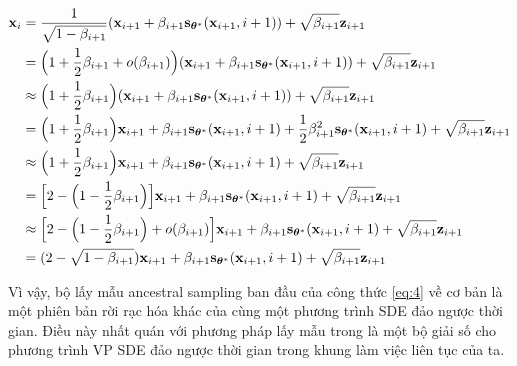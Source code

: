 \documentclass{article} %
\begin{document}
\begin{equation*}
    \begin{aligned}
        \bold{x}_i &= \dfrac{1}{\sqrt{1 - \beta_{i+1}}}(\bold{x}_{i+1} + \beta_{i+1} \bold{s}_{\boldsymbol{\theta}^{\ast}}(\bold{x}_{i+1}, i+1)) + \sqrt{\beta_{i+1}} \bold{z}_{i+1} \\
        &= \Big( 1 + \dfrac{1}{2} \beta_{i+1} + o(\beta_{i+1}) \Big)(\bold{x}_{i+1} + \beta_{i+1} \bold{s}_{\boldsymbol{\theta}^{\ast}}(\bold{x}_{i+1}, i+1)) + \sqrt{\beta_{i+1}} \bold{z}_{i+1} \\
        &\approx \Big( 1 + \dfrac{1}{2}\beta_{i+1} \Big)(\bold{x}_{i+1} + \beta_{i+1} \bold{s}_{\boldsymbol{\theta}^{\ast}}(\bold{x}_{i+1}, i+1)) + \sqrt{\beta_{i+1}} \bold{z}_{i+1} \\
        &= \Big( 1 + \dfrac{1}{2}\beta_{i+1} \Big) \bold{x}_{i+1} + \beta_{i+1} \bold{s}_{\boldsymbol{\theta}^{\ast}} (\bold{x}_{i+1}, i + 1) + \dfrac{1}{2} \beta_{i+1}^2 \bold{s}_{\boldsymbol{\theta}^{\ast}} (\bold{x}_{i+1}, i+1) + \sqrt{\beta_{i+1}} \bold{z}_{i+1} \\
        &\approx \Big( 1 + \dfrac{1}{2}\beta_{i+1} \Big) \bold{x}_{i+1} + \beta_{i+1} \bold{s}_{\boldsymbol{\theta}^{\ast}} (\bold{x}_{i+1}, i + 1) + \sqrt{\beta_{i+1}} \bold{z}_{i+1} \\
        &= \Big \lbrack 2 - \Big ( 1 - \dfrac{1}{2} \beta_{i+1} \Big) \Big \rbrack \bold{x}_{i+1} + \beta_{i+1} \bold{s}_{\boldsymbol{\theta}^{\ast}}(\bold{x}_{i+1}, i+1) + \sqrt{\beta_{i+1}} \bold{z}_{i+1} \\
        &\approx \Big \lbrack 2 - \Big ( 1 - \dfrac{1}{2} \beta_{i+1} \Big) + o(\beta_{i+1}) \Big \rbrack \bold{x}_{i+1} + \beta_{i+1} \bold{s}_{\boldsymbol{\theta}^{\ast}}(\bold{x}_{i+1}, i+1) + \sqrt{\beta_{i+1}} \bold{z}_{i+1} \\
        &= (2 - \sqrt{1 - \beta_{i+1}}) \bold{x}_{i+1} + \beta_{i+1} \bold{s}_{\boldsymbol{\theta}^{\ast}}(\bold{x}_{i+1}, i+1) + \sqrt{\beta_{i+1}} \bold{z}_{i+1} \\
    \end{aligned}
\end{equation*}

Vì vậy, bộ lấy mẫu ancestral sampling ban đầu của công thức \ref{eq:4} về cơ bản là một phiên bản rời rạc hóa khác của cùng một phương trình SDE đảo ngược thời gian.
Điều này nhất quán với phương pháp lấy mẫu trong \citep{ho2020denoising} là một bộ giải số cho phương trình VP SDE đảo ngược thời gian trong khung làm việc liên tục của ta.
\end{document}
